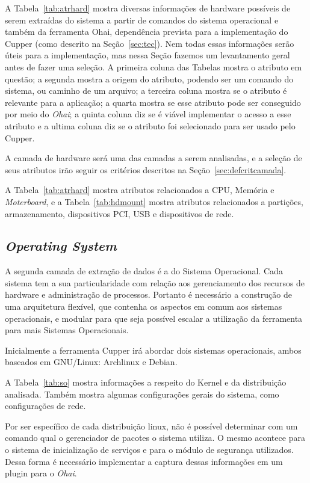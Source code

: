 A Tabela~\ref{tab:atrhard} mostra diversas informações de hardware possíveis de serem extraídas
do sistema a partir de comandos do sistema operacional e também da ferramenta Ohai, 
dependência prevista para a implementação do Cupper (como descrito na 
Seção~\ref{sec:tec}). Nem todas essas informações serão úteis para a 
implementação, mas nessa Seção fazemos um levantamento geral antes de fazer uma
seleção.
A primeira coluna das Tabelas mostra o atributo em questão; a segunda mostra
a origem do atributo, podendo ser um comando do sistema, ou caminho de um arquivo;
a terceira coluna mostra se o atributo é relevante para a aplicação; a quarta mostra se
esse atributo pode ser conseguido por meio do \textit{Ohai}; a quinta coluna 
diz se é viável implementar o acesso a esse atributo e a ultima coluna
diz se o atributo foi selecionado para ser usado pelo Cupper. 

A camada de hardware será uma das camadas a serem analisadas, e a seleção de 
seus atributos irão seguir os critérios descritos na Seção~\ref{sec:defcritcamada}.

A Tabela~\ref{tab:atrhard} mostra atributos relacionados a CPU, Memória e 
\textit{Moterboard}, e a Tabela~\ref{tab:hdmount} mostra atributos relacionados
a partições, armazenamento, dispositivos PCI, USB e dispositivos de rede.


\subsection{\textit{Operating System}}
\label{sec:cam-os}

A segunda camada de extração de dados é a do Sistema Operacional. 
Cada sistema tem a sua particularidade com relação aos gerenciamento dos 
recursos de hardware e administração de processos. Portanto é necessário a 
construção de uma arquitetura flexível, que contenha os aspectos em comum aos
sistemas operacionais, e modular para que seja possível escalar a utilização 
da ferramenta para mais Sistemas Operacionais.

Inicialmente a ferramenta Cupper irá abordar dois sistemas operacionais, 
ambos baseados em GNU/Linux: Archlinux e Debian.

A Tabela~\ref{tab:so} mostra informações a respeito do Kernel e da distribuição
analisada. Também mostra algumas configurações gerais do sistema, como
configurações de rede.

Por ser específico de cada distribuição linux, não é possível determinar com um
comando qual o gerenciador de pacotes o sistema utiliza. O mesmo acontece para
o sistema de inicialização de serviços e para o módulo de segurança utilizados.
Dessa forma é necessário implementar a captura dessas informações em um plugin 
para o \textit{Ohai}.

